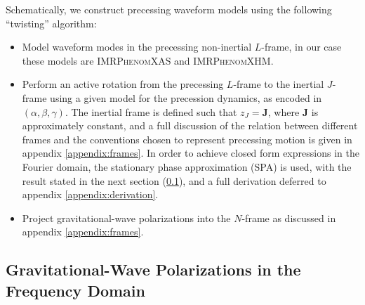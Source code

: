 \documentclass[%
aps,
prd,
amssymb,
amsmath,
amsfonts,
eqsecnum,
showpacs,
nofootinbib,
floatfix,
twocolumn,
twoside,
a4paper,
superscriptaddress
]{revtex4-1}
\newcommand{\hP}{{\hat{\bf{P}}}}
\newcommand{\hQ}{{\hat{\bf{Q}}}}
\newcommand{\J}{\mathbf{J}}
\newcommand{\phX}{\textsc{IMRPhenomXAS}\xspace}
\newcommand{\phXHM}{\textsc{IMRPhenomXHM}\xspace}
\begin{document}
Schematically, we construct precessing waveform models using the following ``twisting'' algorithm:
\begin{itemize}
    \item Model waveform modes in the precessing non-inertial $L$-frame, in our case these models are \phX and \phXHM.
    \item Perform an active rotation from the precessing $L$-frame to the inertial $J$-frame using a given model for the precession dynamics, as encoded in $(\alpha, \beta, \gamma)$. The inertial frame is defined such that $z_J = \J$, where $\J$ is approximately constant, and a full discussion of the relation between different frames and the conventions chosen to represent precessing motion is given in appendix \ref{appendix:frames}. In order to achieve closed form expressions in the Fourier domain, the stationary phase approximation (SPA) is used, with the result stated in the next section  (\ref{sec:FD_polarizations}), and a full derivation deferred to appendix \ref{appendix:derivation}.
 \item Project gravitational-wave polarizations into the $N$-frame
 as discussed in appendix \ref{appendix:frames}. 
\end{itemize}


\subsection{Gravitational-Wave Polarizations in the Frequency Domain}\label{sec:FD_polarizations}
\end{document}
